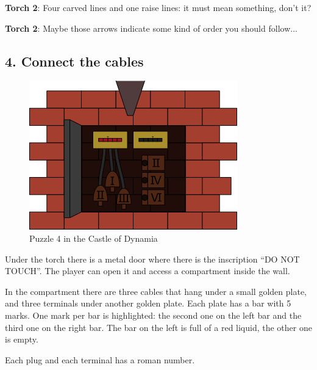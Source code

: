\textbf{Torch 2}: Four carved lines and one raise lines: it must mean something, don't it?

\textbf{Torch 2}: Maybe those arrows indicate some kind of order you should follow...



\subsection{4. Connect the cables}

\begin{figure}[H]
  \centering
  \includegraphics[width=\textwidth]{Images/Puzzles/castleOfDynamia4}
  \caption{Puzzle 4 in the Castle of Dynamia}
\end{figure}


Under the torch there is a metal door where there is the inscription \enquote{DO NOT TOUCH}. The player can open it and access a compartment inside the wall.

In the compartment there are three cables that hang under a small golden plate, and three terminals under another golden plate. Each plate has a bar with 5 marks. One mark per bar is highlighted: the second one on the left bar and the third one on the right bar. The bar on the left is full of a red liquid, the other one is empty.

Each plug and each terminal has a roman number.

